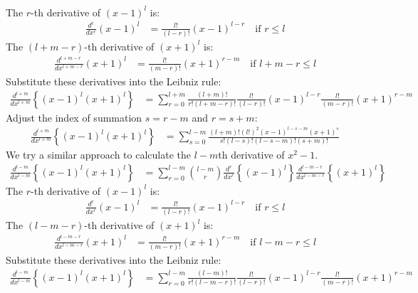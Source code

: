 \begin{enumerate}
\begin{align}
        \end{align}
        The \( r \)-th derivative of \( (x-1)^l \) is:
        \begin{align*}
            \frac{d^r}{dx^r} (x-1)^l &= \frac{l!}{(l-r)!} (x-1)^{l-r} \quad \text{if } r \leq l
        \end{align*}
        The \( (l+m-r) \)-th derivative of \( (x+1)^l \) is:
        \begin{align*}
            \frac{d^{l+m-r}}{dx^{l+m-r}} (x+1)^l &= \frac{l!}{(m-r)!} (x+1)^{r-m} \quad \text{if } l+m-r \leq l
        \end{align*}
        Substitute these derivatives into the Leibniz rule:
        \begin{align*}
            \frac{d^{l+m}}{dx^{l+m}} \left\{(x-1)^l (x+1)^l\right\} &= \sum_{r=0}^{l+m} \frac{(l+m)!}{r! (l+m-r)!} \frac{l!}{(l-r)!} (x-1)^{l-r} \frac{l!}{(m-r)!} (x+1)^{r-m}
        \end{align*}
        Adjust the index of summation $\displaystyle s = r - m$ and $r = s + m$:
        \begin{align}
            \frac{d^{l+m}}{dx^{l+m}} \left\{(x-1)^l (x+1)^l\right\}&= \sum_{s=0}^{l-m} \frac{(l+m)!(l!)^2(x-1)^{l-s-m} (x+1)^s}{s!(l-s)!(l-s-m)!(s+m)!}
        \end{align}
        We try a similar approach to calculate the $l-m$th derivative of $x^2-1$.
        \begin{align*}
            \frac{d^{l-m}}{dx^{l-m}} \left\{(x-1)^l (x+1)^l\right\} &= \sum_{r=0}^{l-m} \binom{l-m}{r} \frac{d^r}{dx^r} \left\{(x-1)^l\right\} \frac{d^{l-m-r}}{dx^{l-m-r}} \left\{(x+1)^l\right\}
        \end{align*}
        The \( r \)-th derivative of \( (x-1)^l \) is:
        \begin{align*}
        \frac{d^r}{dx^r} (x-1)^l &= \frac{l!}{(l-r)!} (x-1)^{l-r} \quad \text{if } r \leq l
        \end{align*}
        The \( (l-m-r) \)-th derivative of \( (x+1)^l \) is:
        \begin{align*}
            \frac{d^{l-m-r}}{dx^{l-m-r}} (x+1)^l &= \frac{l!}{(m-r)!} (x+1)^{r-m} \quad \text{if } l-m-r \leq l
        \end{align*}
        Substitute these derivatives into the Leibniz rule:
        \begin{align*}
            \frac{d^{l-m}}{dx^{l-m}} \left\{(x-1)^l (x+1)^l\right\} &= \sum_{r=0}^{l-m} \frac{(l-m)!}{r! (l-m-r)!} \frac{l!}{(l-r)!} (x-1)^{l-r} \frac{l!}{(m-r)!} (x+1)^{r-m}

\end{align*}
\end{enumerate}
